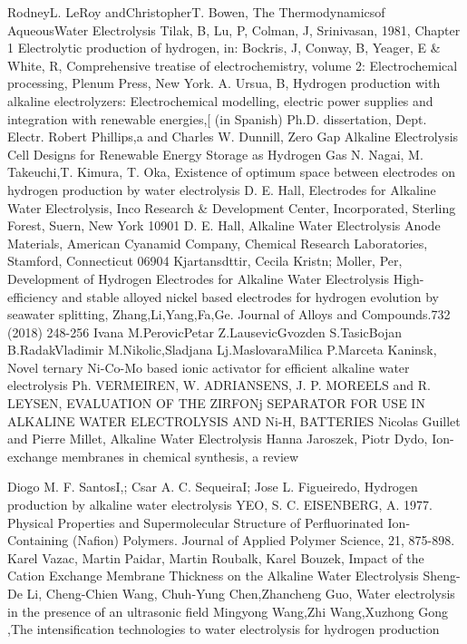 \documentclass[11pt, a4paper]{article}
\begin{document}
\begin{thebibliography}{99}
RodneyL. LeRoy andChristopherT. Bowen, The Thermodynamicsof AqueousWater Electrolysis
Tilak, B, Lu, P, Colman, J,  Srinivasan,  1981, Chapter 1  Electrolytic production of hydrogen, in: Bockris, J, Conway, B, Yeager, E \& White, R, Comprehensive treatise of electrochemistry, volume 2: Electrochemical processing, Plenum Press, New York.
A. Ursua, B, Hydrogen production with alkaline electrolyzers: Electrochemical modelling, electric power supplies
and integration with renewable energies,[ (in Spanish) Ph.D. dissertation, Dept. Electr.
Robert Phillips,a and Charles W. Dunnill,  Zero Gap Alkaline Electrolysis Cell Designs for
 Renewable Energy Storage as Hydrogen Gas
N. Nagai, M. Takeuchi,T. Kimura, T. Oka, Existence of optimum space between electrodes on hydrogen production by water electrolysis
D. E. Hall, Electrodes for Alkaline Water Electrolysis, Inco Research \& Development Center, Incorporated, Sterling Forest, Suern, New York 10901
D. E. Hall, Alkaline Water Electrolysis Anode Materials, American Cyanamid Company, Chemical Research Laboratories, Stamford, Connecticut 06904
Kjartansdttir, Cecila Kristn; Moller, Per, Development of Hydrogen Electrodes for Alkaline Water Electrolysis
High-efficiency and stable alloyed nickel based electrodes for hydrogen evolution by seawater splitting, Zhang,Li,Yang,Fa,Ge. Journal of Alloys and Compounds.732 (2018) 248-256
Ivana M.PerovicPetar Z.LausevicGvozden S.TasicBojan B.RadakVladimir M.Nikolic,Sladjana Lj.MaslovaraMilica P.Marceta Kaninsk, Novel ternary Ni-Co-Mo based ionic activator for efficient alkaline water electrolysis
Ph. VERMEIREN, W. ADRIANSENS, J. P. MOREELS and R. LEYSEN,  EVALUATION OF THE ZIRFONj SEPARATOR FOR USE IN ALKALINE WATER ELECTROLYSIS AND Ni-H, BATTERIES
Nicolas Guillet and Pierre Millet, Alkaline Water Electrolysis
Hanna Jaroszek, Piotr Dydo, Ion-exchange membranes in chemical synthesis, a review


Diogo M. F. SantosI,; Csar A. C. SequeiraI; Jose L. Figueiredo, Hydrogen production by alkaline water electrolysis
YEO, S. C.  EISENBERG, A. 1977. Physical Properties and Supermolecular Structure of Perfluorinated
Ion-Containing (Nafion) Polymers. Journal of Applied Polymer Science, 21, 875-898.
Karel Vazac, Martin Paidar, Martin Roubalk, Karel Bouzek, Impact of the Cation Exchange Membrane Thickness on the Alkaline Water Electrolysis
Sheng-De Li, Cheng-Chien Wang, Chuh-Yung Chen,Zhancheng Guo, Water electrolysis in the presence of an ultrasonic field
Mingyong Wang,Zhi Wang,Xuzhong Gong ,The intensification technologies to water electrolysis for hydrogen production


\end{thebibliography}
\end{document}
